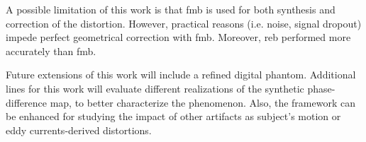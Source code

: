 A possible limitation of this work is that \gls*{fmb} is used for both synthesis and correction of the
  distortion.
However, practical reasons (i.e. noise, signal dropout) impede perfect geometrical correction with \gls*{fmb}.
Moreover, \gls*{reb} performed more accurately than \gls*{fmb}.

Future extensions of this work will include a refined digital phantom.
Additional lines for this work will evaluate different realizations of the synthetic phase-difference map,
  to better characterize the phenomenon.
Also, the framework can be enhanced for studying the impact of other artifacts as subject's motion or eddy
  currents-derived distortions.